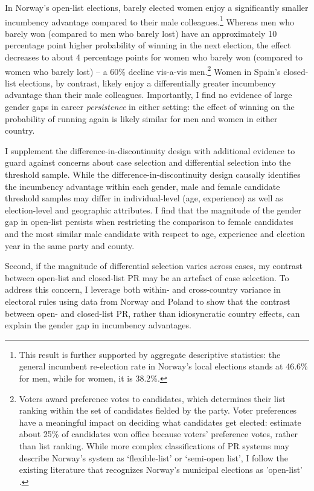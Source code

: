 \documentclass[12pt]{article}
\begin{document}
In Norway's open-list elections, barely elected women enjoy a significantly smaller incumbency advantage compared to their male colleagues.\footnote{This result is further supported by aggregate descriptive statistics: the general incumbent re-election rate in Norway's local elections stands at 46.6\% for men, while for women, it is 38.2\%.} Whereas men who barely won (compared to men who barely lost) have an approximately 10 percentage point higher probability of winning in the next election, the effect decreases to about 4 percentage points for women who barely won (compared to women who barely lost) -- a 60\% decline vis-a-vis men.\footnote{\label{fn:norway_system}

Voters award preference votes to candidates, which determines their list ranking within the set of candidates fielded by the party. Voter preferences have a meaningful impact on deciding what candidates get elected: \citet{bergh2010} estimate about 25\% of candidates won office because voters' preference votes, rather than list ranking.
While more complex classifications of PR systems may describe Norway's system as `flexible-list' or `semi-open list', I follow the existing literature that recognizes Norway's municipal elections as 'open-list' \citep{fiva2018a, fiva2018b}.} Women in Spain's closed-list elections, by contrast, likely enjoy a differentially greater incumbency advantage than their male colleagues. Importantly, I find no evidence of large gender gaps in career \emph{persistence} in either setting: the effect of winning on the probability of running again is likely similar for men and women in either country.

I supplement the difference-in-discontinuity design with additional evidence to guard against concerns about case selection and differential selection into the threshold sample. While the difference-in-discontinuity design causally identifies the incumbency advantage within each gender, male and female candidate threshold samples may differ in individual-level (age, experience) as well as election-level and geographic attributes. I find that the magnitude of the gender gap in open-list persists when restricting the comparison to female candidates and the most similar male candidate with respect to age, experience and election year in the same party and county.

Second, if the magnitude of differential selection varies across cases, my contrast between open-list and closed-list PR may be an artefact of case selection. To address this concern, I leverage both within- and cross-country variance in electoral rules using data from Norway and Poland to show that the contrast between open- and closed-list PR, rather than idiosyncratic country effects, can explain the gender gap in incumbency advantages.
\end{document}

